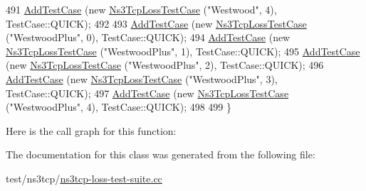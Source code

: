 \begin{DoxyCode}
491   \hyperlink{classns3_1_1TestCase_a3718088e3eefd5d6454569d2e0ddd835}{AddTestCase} (\textcolor{keyword}{new} \hyperlink{classNs3TcpLossTestCase}{Ns3TcpLossTestCase} (\textcolor{stringliteral}{"Westwood"}, 4), TestCase::QUICK);
492 
493   \hyperlink{classns3_1_1TestCase_a3718088e3eefd5d6454569d2e0ddd835}{AddTestCase} (\textcolor{keyword}{new} \hyperlink{classNs3TcpLossTestCase}{Ns3TcpLossTestCase} (\textcolor{stringliteral}{"WestwoodPlus"}, 0), TestCase::QUICK);
494   \hyperlink{classns3_1_1TestCase_a3718088e3eefd5d6454569d2e0ddd835}{AddTestCase} (\textcolor{keyword}{new} \hyperlink{classNs3TcpLossTestCase}{Ns3TcpLossTestCase} (\textcolor{stringliteral}{"WestwoodPlus"}, 1), TestCase::QUICK);
495   \hyperlink{classns3_1_1TestCase_a3718088e3eefd5d6454569d2e0ddd835}{AddTestCase} (\textcolor{keyword}{new} \hyperlink{classNs3TcpLossTestCase}{Ns3TcpLossTestCase} (\textcolor{stringliteral}{"WestwoodPlus"}, 2), TestCase::QUICK);
496   \hyperlink{classns3_1_1TestCase_a3718088e3eefd5d6454569d2e0ddd835}{AddTestCase} (\textcolor{keyword}{new} \hyperlink{classNs3TcpLossTestCase}{Ns3TcpLossTestCase} (\textcolor{stringliteral}{"WestwoodPlus"}, 3), TestCase::QUICK);
497   \hyperlink{classns3_1_1TestCase_a3718088e3eefd5d6454569d2e0ddd835}{AddTestCase} (\textcolor{keyword}{new} \hyperlink{classNs3TcpLossTestCase}{Ns3TcpLossTestCase} (\textcolor{stringliteral}{"WestwoodPlus"}, 4), TestCase::QUICK);
498 
499 \}
\end{DoxyCode}


Here is the call graph for this function\+:




The documentation for this class was generated from the following file\+:\begin{DoxyCompactItemize}
\item 
test/ns3tcp/\hyperlink{ns3tcp-loss-test-suite_8cc}{ns3tcp-\/loss-\/test-\/suite.\+cc}\end{DoxyCompactItemize}
